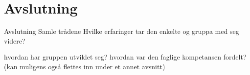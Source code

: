 \section{Avslutning}
Avslutning
Samle trådene
Hvilke erfaringer tar den enkelte og gruppa med seg videre?

hvordan har gruppen utviklet seg?
hvordan var den faglige kompetansen fordelt? (kan muligens også flettes inn under et annet avsnitt)